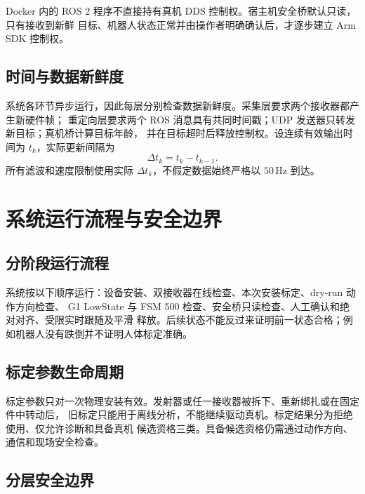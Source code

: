 Docker 内的 ROS 2 程序不直接持有真机 DDS 控制权。宿主机安全桥默认只读，只有接收到新鲜
目标、机器人状态正常并由操作者明确确认后，才逐步建立 Arm SDK 控制权。

\subsection{时间与数据新鲜度}
\label{subsec:ch3_data_freshness}

系统各环节异步运行，因此每层分别检查数据新鲜度。采集层要求两个接收器都产生新硬件帧；
重定向层要求两个 ROS 消息具有共同时间戳；UDP 发送器只转发新目标；真机桥计算目标年龄，
并在目标超时后释放控制权。设连续有效输出时间为 $t_k$，实际更新间隔为
\begin{equation}
  \Delta t_k=t_k-t_{k-1}.
  \label{eq:ch3_update_interval}
\end{equation}
所有滤波和速度限制使用实际 $\Delta t_k$，不假定数据始终严格以 $50\,\mathrm{Hz}$ 到达。

\section{系统运行流程与安全边界}
\label{sec:ch3_operation_safety}

\subsection{分阶段运行流程}
\label{subsec:ch3_operating_sequence}

系统按以下顺序运行：设备安装、双接收器在线检查、本次安装标定、dry-run 动作方向检查、
G1 LowState 与 FSM 500 检查、安全桥只读检查、人工确认和绝对对齐、受限实时跟随及平滑
释放。后续状态不能反过来证明前一状态合格；例如机器人没有跌倒并不证明人体标定准确。

\subsection{标定参数生命周期}
\label{subsec:ch3_calibration_lifecycle}

标定参数只对一次物理安装有效。发射器或任一接收器被拆下、重新绑扎或在固定件中转动后，
旧标定只能用于离线分析，不能继续驱动真机。标定结果分为拒绝使用、仅允许诊断和具备真机
候选资格三类。具备候选资格仍需通过动作方向、通信和现场安全检查。

\subsection{分层安全边界}
\label{subsec:ch3_layered_safety_boundary}

